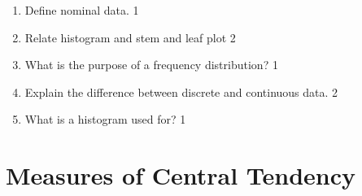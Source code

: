 \documentclass[a4paper,oneside]{book}
\begin{document}
\begin{enumerate}
\item Define nominal data. \hfill 1
  \item Relate histogram and stem and leaf plot \hfill 2

\item What is the purpose of a frequency distribution? \hfill 1

\item Explain the difference between discrete and continuous data. \hfill 2

\item What is a histogram used for? \hfill 1



\end{enumerate}

\chapter{Measures of Central Tendency} 
\end{document}

